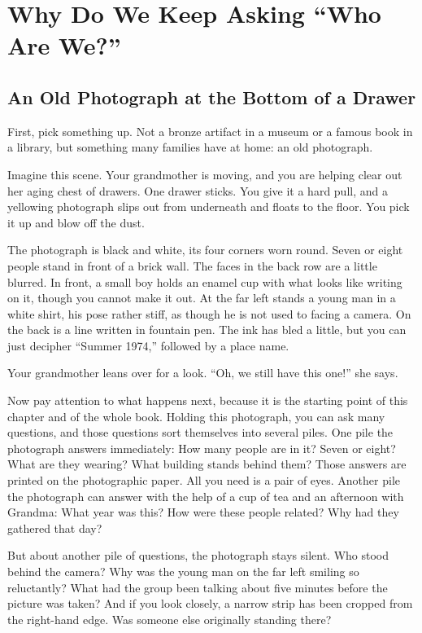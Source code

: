 \chapter{Why Do We Keep Asking ``Who Are We?''}
\section{An Old Photograph at the Bottom of a Drawer}
First, pick something up. Not a bronze artifact in a museum or a famous book in a library, but something many families have at home: an old photograph.

Imagine this scene. Your grandmother is moving, and you are helping clear out her aging chest of drawers. One drawer sticks. You give it a hard pull, and a yellowing photograph slips out from underneath and floats to the floor. You pick it up and blow off the dust.

The photograph is black and white, its four corners worn round. Seven or eight people stand in front of a brick wall. The faces in the back row are a little blurred. In front, a small boy holds an enamel cup with what looks like writing on it, though you cannot make it out. At the far left stands a young man in a white shirt, his pose rather stiff, as though he is not used to facing a camera. On the back is a line written in fountain pen. The ink has bled a little, but you can just decipher ``Summer 1974,'' followed by a place name.

Your grandmother leans over for a look. ``Oh, we still have this one!'' she says.

Now pay attention to what happens next, because it is the starting point of this chapter and of the whole book. Holding this photograph, you can ask many questions, and those questions sort themselves into several piles. One pile the photograph answers immediately: How many people are in it? Seven or eight? What are they wearing? What building stands behind them? Those answers are printed on the photographic paper. All you need is a pair of eyes. Another pile the photograph can answer with the help of a cup of tea and an afternoon with Grandma: What year was this? How were these people related? Why had they gathered that day?

But about another pile of questions, the photograph stays silent. Who stood behind the camera? Why was the young man on the far left smiling so reluctantly? What had the group been talking about five minutes before the picture was taken? And if you look closely, a narrow strip has been cropped from the right-hand edge. Was someone else originally standing there?

